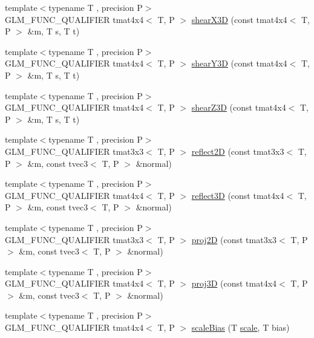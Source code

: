 \begin{DoxyCompactItemize}
{\footnotesize template$<$typename T , precision P$>$ }\\G\+L\+M\+\_\+\+F\+U\+N\+C\+\_\+\+Q\+U\+A\+L\+I\+F\+I\+E\+R tmat4x4$<$ T, P $>$ \hyperlink{group__gtx__transform2_gae06ce274e4754f925d5d68440e89452e}{shear\+X3\+D} (const tmat4x4$<$ T, P $>$ \&m, T s, T t)
\item 
{\footnotesize template$<$typename T , precision P$>$ }\\G\+L\+M\+\_\+\+F\+U\+N\+C\+\_\+\+Q\+U\+A\+L\+I\+F\+I\+E\+R tmat4x4$<$ T, P $>$ \hyperlink{group__gtx__transform2_ga31253ea18fdcdfde08c134c8b67688f7}{shear\+Y3\+D} (const tmat4x4$<$ T, P $>$ \&m, T s, T t)
\item 
{\footnotesize template$<$typename T , precision P$>$ }\\G\+L\+M\+\_\+\+F\+U\+N\+C\+\_\+\+Q\+U\+A\+L\+I\+F\+I\+E\+R tmat4x4$<$ T, P $>$ \hyperlink{group__gtx__transform2_ga5558ac64a7144685bf2eb4483a0e2f51}{shear\+Z3\+D} (const tmat4x4$<$ T, P $>$ \&m, T s, T t)
\item 
{\footnotesize template$<$typename T , precision P$>$ }\\G\+L\+M\+\_\+\+F\+U\+N\+C\+\_\+\+Q\+U\+A\+L\+I\+F\+I\+E\+R tmat3x3$<$ T, P $>$ \hyperlink{namespaceglm_a802031b2958b6a0777adb5fd463b3388}{reflect2\+D} (const tmat3x3$<$ T, P $>$ \&m, const tvec3$<$ T, P $>$ \&normal)
\item 
{\footnotesize template$<$typename T , precision P$>$ }\\G\+L\+M\+\_\+\+F\+U\+N\+C\+\_\+\+Q\+U\+A\+L\+I\+F\+I\+E\+R tmat4x4$<$ T, P $>$ \hyperlink{namespaceglm_ad49694a519eed29dee61d6aa7d8c11b0}{reflect3\+D} (const tmat4x4$<$ T, P $>$ \&m, const tvec3$<$ T, P $>$ \&normal)
\item 
{\footnotesize template$<$typename T , precision P$>$ }\\G\+L\+M\+\_\+\+F\+U\+N\+C\+\_\+\+Q\+U\+A\+L\+I\+F\+I\+E\+R tmat3x3$<$ T, P $>$ \hyperlink{group__gtx__transform2_gacfce1085167a8bfb71a55ea14d22752f}{proj2\+D} (const tmat3x3$<$ T, P $>$ \&m, const tvec3$<$ T, P $>$ \&normal)
\item 
{\footnotesize template$<$typename T , precision P$>$ }\\G\+L\+M\+\_\+\+F\+U\+N\+C\+\_\+\+Q\+U\+A\+L\+I\+F\+I\+E\+R tmat4x4$<$ T, P $>$ \hyperlink{group__gtx__transform2_gafab0418f2503ec2133cb2de828cc482a}{proj3\+D} (const tmat4x4$<$ T, P $>$ \&m, const tvec3$<$ T, P $>$ \&normal)
\item 
{\footnotesize template$<$typename T , precision P$>$ }\\G\+L\+M\+\_\+\+F\+U\+N\+C\+\_\+\+Q\+U\+A\+L\+I\+F\+I\+E\+R tmat4x4$<$ T, P $>$ \hyperlink{namespaceglm_a9760927365b8beff0213eedeca8cc61d}{scale\+Bias} (T \hyperlink{group__gtc__matrix__transform_ga8f062fcc07e2445500793f2803afebb0}{scale}, T bias)

\end{DoxyCompactItemize}
